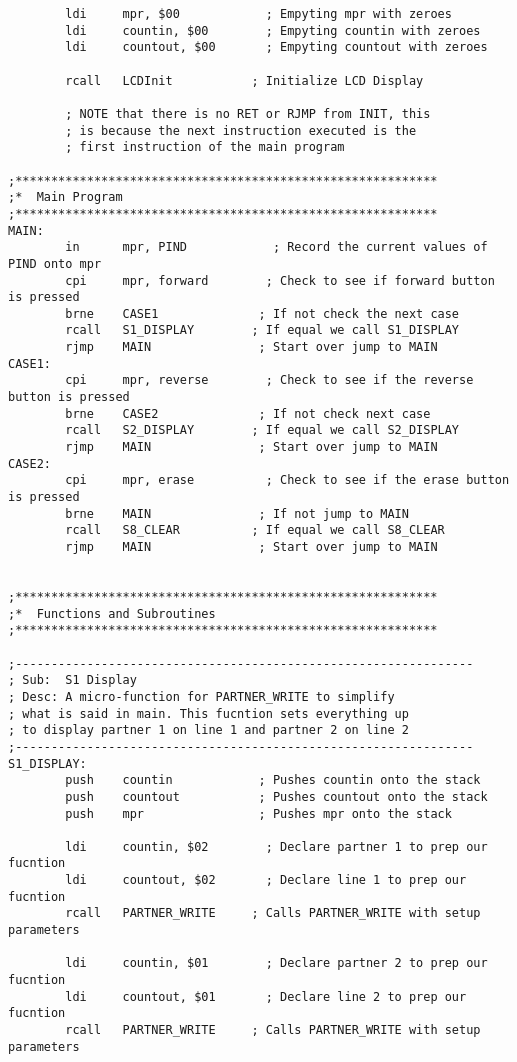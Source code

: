 \documentclass[12pt, letterpaper]{article}
\begin{document}
\begin{verbatim}
		ldi		mpr, $00            ; Empyting mpr with zeroes
		ldi		countin, $00        ; Empyting countin with zeroes
		ldi		countout, $00       ; Empyting countout with zeroes

		rcall	LCDInit           ; Initialize LCD Display

		; NOTE that there is no RET or RJMP from INIT, this
		; is because the next instruction executed is the
		; first instruction of the main program

;***********************************************************
;*	Main Program
;***********************************************************
MAIN:
		in		mpr, PIND            ; Record the current values of PIND onto mpr
		cpi		mpr, forward        ; Check to see if forward button is pressed
		brne	CASE1              ; If not check the next case
		rcall	S1_DISPLAY        ; If equal we call S1_DISPLAY
		rjmp	MAIN               ; Start over jump to MAIN
CASE1:	
		cpi		mpr, reverse        ; Check to see if the reverse button is pressed
		brne	CASE2              ; If not check next case
		rcall	S2_DISPLAY        ; If equal we call S2_DISPLAY
		rjmp	MAIN               ; Start over jump to MAIN
CASE2:  
		cpi		mpr, erase          ; Check to see if the erase button is pressed
		brne	MAIN               ; If not jump to MAIN
		rcall	S8_CLEAR          ; If equal we call S8_CLEAR
		rjmp	MAIN               ; Start over jump to MAIN


;***********************************************************
;*	Functions and Subroutines
;***********************************************************

;----------------------------------------------------------------
; Sub:	S1 Display
; Desc:	A micro-function for PARTNER_WRITE to simplify
; what is said in main. This fucntion sets everything up
; to display partner 1 on line 1 and partner 2 on line 2
;----------------------------------------------------------------
S1_DISPLAY:
		push	countin            ; Pushes countin onto the stack
		push	countout           ; Pushes countout onto the stack
		push	mpr                ; Pushes mpr onto the stack

		ldi		countin, $02        ; Declare partner 1 to prep our fucntion
		ldi		countout, $02       ; Declare line 1 to prep our fucntion
		rcall	PARTNER_WRITE     ; Calls PARTNER_WRITE with setup parameters

		ldi		countin, $01        ; Declare partner 2 to prep our fucntion
		ldi		countout, $01       ; Declare line 2 to prep our fucntion
		rcall	PARTNER_WRITE     ; Calls PARTNER_WRITE with setup parameters


\end{verbatim}
\end{document}
